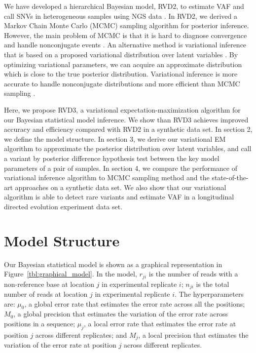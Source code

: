 \documentclass[11pt,reqno]{amsart}
\begin{document}
We have developed a hierarchical Bayesian model, RVD2, to estimate VAF and call SNVs in heterogeneous samples using NGS data \citep{he2015rvd2}.
In RVD2, we derived a Markov Chain Monte Carlo (MCMC) sampling algorithm for posterior inference.
However, the main problem of MCMC is that it is hard to diagnose convergence and handle nonconjugate events \citep{jordan1999introduction}.
An alternative method is variational inference that is based on a proposed variational distribution over latent variables \citep{jordan1999introduction}. By optimizing variational parameters, we can acquire an approximate distribution which is close to the true posterior distribution.
Variational inference is more accurate to handle nonconjugate distributions and more efficient than MCMC sampling \citep{peterson1989explorations}.

Here, we propose RVD3, a variational expectation-maximization algorithm for our Bayesian statistical model inference.
We show than RVD3 achieves improved accuracy and efficiency compared with RVD2 in a synthetic data set.
In section 2, we define the model structure.
In section 3, we derive our variational EM algorithm to approximate the posterior distribution over latent variables, and call a variant by posterior difference hypothesis test between the key model parameters of a pair of samples.
In section 4, we compare the performance of variational inference algorithm to MCMC sampling method and the state-of-the-art approaches on a synthetic data set.
We also show that our variational algorithm is able to detect rare variants and estimate VAF in a longitudinal directed evolution experiment data set.

\section{Model Structure}
Our Bayesian statistical model is shown as a graphical representation in Figure~\ref{tbl:graphical_model}.
In the model, $r_{ji}$ is the number of reads with a non-reference base at location $j$ in experimental replicate $i$; $n_{ji}$ is the total number of reads at location $j$ in experimental replicate $i$.
The hyperparameters are:
$\mu_0$, a global error rate that estimates the error rate across all the positions;
$M_0$, a global precision that estimates the variation of the error rate across positions in a sequence;
$ \mu_j $, a local error rate that estimates the error rate at position $j$ across different replicates;
and $M_j$, a local precision that estimates the variation of the error rate at position $j$ across different replicates.
\end{document}
